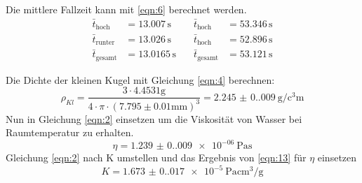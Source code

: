 Die mittlere Fallzeit kann mit \ref{eqn:6} berechnet werden.\\
\begin{align}
  \bar{t}_{\text{hoch}} &= 13.007\,\unit{\second}  \quad &\bar{t}_{\text{hoch}} &= 53.346\,\unit{\second}\\
  \bar{t}_{\text{runter}} &= 13.026\,\unit{\second}  \quad &\bar{t}_{\text{hoch}} &= 52.896\,\unit{\second}\\
  \bar{t}_{\text{gesamt}} &= 13.0165\,\unit{\second}  \quad &\bar{t}_{\text{gesamt}} &= 53.121\,\unit{\second}
\end{align}

Die Dichte der kleinen Kugel mit Gleichung \ref{eqn:4} berechnen:
\begin{equation}
  ρ_{Kl} = \frac{3 \cdot 4.4531 \unit{\gram}}{4 \cdot π \cdot (7.795 \pm 0.01 \unit{\milli\meter})^3} = \SI{2.245(0.009)}{\g\per\cubic\centi\metre}
\end{equation}\label{eqn:13}
Nun in Gleichung \eqref{eqn:2} einsetzen um die Viskosität von Wasser bei Raumtemperatur zu erhalten.
\begin{equation}
  η = \SI{1.239(0.009)e-06}{\pascal\s}
\end{equation}
Gleichung \ref{eqn:2} nach K umstellen und das Ergebnis von \ref{eqn:13} für $η$ einsetzen
\begin{equation}
  K = \SI{1.673(0.017)e-5}{\pascal\centi\cubic\meter\per\gram}
\end{equation}
\newpage

